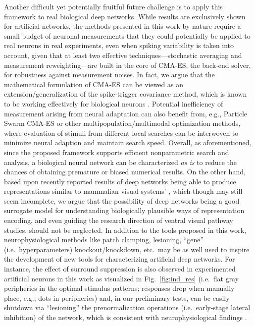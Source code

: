 Another difficult yet potentially fruitful future challenge is to apply this framework to real biological deep networks. While results are exclusively shown for artificial networks, the methods presented in this work by nature require a small budget of neuronal measurements that they could potentially be applied to real neurons in real experiments, even when spiking variability is taken into account, given that at least two effective techniques---stochastic averaging and measurement reweighting---are built in the core of CMA-ES, the back-end solver, for robustness against measurement noises. In fact, we argue that the mathematical formulation of CMA-ES can be viewed as an extension/generalization of the spike-trigger covariance method, which is known to be working effectively for biological neurons \cite{rust2004spike}. Potential inefficiency of measurement arising from neural adaptation \cite{kohn2007visual} can also benefit from, e.g., Particle Swarm CMA-ES \cite{muller2009particle} or other multipopulation/multimodal optimization methods, where evaluation of stimuli from different local searches can be interwoven to minimize neural adaption and maintain search speed. Overall, as aforementioned, since the proposed framework supports efficient nonparametric search and analysis, a biological neural network can be characterized \emph{as is} to reduce the chances of obtaining premature or biased numerical results. On the other hand, based upon recently reported results of deep networks being able to produce representations similar to mammalian visual systems' \cite{yamins2014performance, cadieu2014deep}, which though may still seem incomplete, we argue that the possibility of deep networks being a good surrogate model for understanding biologically plausible ways of representation encoding, and even guiding the research direction of ventral visual pathway studies, should not be neglected. In addition to the tools proposed in this work, neurophysiological methods like patch clamping, lesioning, ``gene'' (i.e.~hyperparameters) knockout/knockdown, etc.~may be as well used to inspire the development of new tools for characterizing artificial deep networks. For instance, the effect of surround suppression is also observed in experimented artificial neurons in this work as visualized in Fig.~\ref{fig:ind_res} (i.e.~flat gray peripheries in the optimal stimulus patterns; responses drop when manually place, e.g., dots in peripheries) and, in our preliminary tests, can be easily shutdown via ``lesioning'' the prenormalization operations (i.e.~early-stage lateral inhibition) of the network, which is consistent with neurophysiological findings \cite{cavanaugh2002selectivity}.

